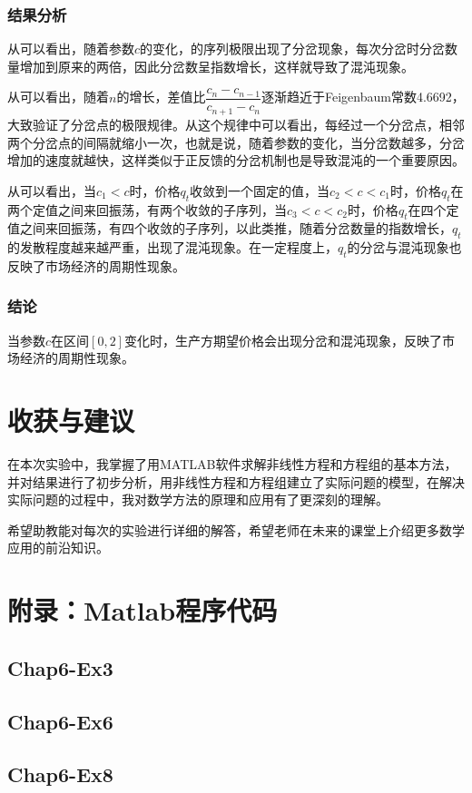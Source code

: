 \documentclass[12pt,a4paper]{article}
\begin{document}
\subsubsection{结果分析}

从可以看出，随着参数$c$的变化，的序列极限出现了分岔现象，每次分岔时分岔数量增加到原来的两倍，因此分岔数呈指数增长，这样就导致了混沌现象。

从可以看出，随着$n$的增长，差值比$\dfrac{c_n-c_{n-1}}{c_{n+1}-c_n}$逐渐趋近于Feigenbaum常数4.6692，大致验证了分岔点的极限规律。从这个规律中可以看出，每经过一个分岔点，相邻两个分岔点的间隔就缩小一次，也就是说，随着参数的变化，当分岔数越多，分岔增加的速度就越快，这样类似于正反馈的分岔机制也是导致混沌的一个重要原因。

从可以看出，当$c_1 < c$时，价格$q_t$收敛到一个固定的值，当$c_2 < c < c_1$时，价格$q_t$在两个定值之间来回振荡，有两个收敛的子序列，当$c_3<c<c_2$时，价格$q_t$在四个定值之间来回振荡，有四个收敛的子序列，以此类推，随着分岔数量的指数增长，$q_t$的发散程度越来越严重，出现了混沌现象。在一定程度上，$q_t$的分岔与混沌现象也反映了市场经济的周期性现象。

\subsubsection{结论}

当参数$c$在区间$[0,2]$变化时，生产方期望价格会出现分岔和混沌现象，反映了市场经济的周期性现象。

\section{收获与建议}

在本次实验中，我掌握了用MATLAB软件求解非线性方程和方程组的基本方法，并对结果进行了初步分析，用非线性方程和方程组建立了实际问题的模型，在解决实际问题的过程中，我对数学方法的原理和应用有了更深刻的理解。

希望助教能对每次的实验进行详细的解答，希望老师在未来的课堂上介绍更多数学应用的前沿知识。

\section{附录：Matlab程序代码}

\subsection{Chap6-Ex3}\label{sec:ex3_code}



\subsection{Chap6-Ex6}\label{sec:ex6_code}



\subsection{Chap6-Ex8}\label{sec:ex8_code}


\end{document}
